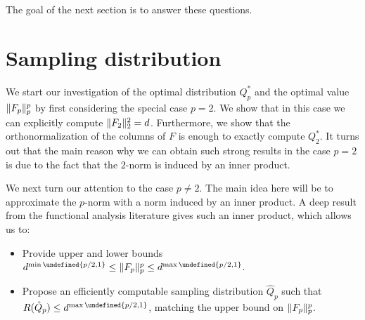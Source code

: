 \documentclass{article}
\theoremstyle{plain}
\theoremstyle{definition}
\theoremstyle{remark}
\let\brace\undefined
\DeclarePairedDelimiter{\brace}{\lbrace}{\rbrace}
\DeclarePairedDelimiter{\norm}{\lVert}{\rVert}
\begin{document}
The goal of the next section is to answer these questions.

\section{Sampling distribution}
We start our investigation of the optimal distribution $Q_p^{*}$ and the optimal value $\norm{F_p}_p^p$ by first considering the special case $p=2$. We show that in this case we can explicitly compute $\norm{F_2}_{2}^{2} = d$. Furthermore, we show that the orthonormalization of the columns of $F$ is enough to exactly compute $Q_2^{*}$. It turns out that the main reason why we can obtain such strong results in the case $p=2$ is due to the fact that the $2$-norm is induced by an inner product.

We next turn our attention to the case $p \neq 2$. The main idea here will be to approximate the $p$-norm with a norm induced by an inner product. A deep result from the functional analysis literature gives such an inner product, which allows us to:
\begin{itemize}
    \item Provide upper and lower bounds $d^{\min{\brace{p/2, 1}}} \leq \norm{F_p}_p^p \leq d^{\max{\brace{p/2, 1}}}$.
    \item Propose an efficiently computable sampling distribution $\hat{Q}_p$ such that $R(\hat{Q}_p) \leq d^{\max{\brace{p/2, 1}}}$, matching the upper bound on $\norm{F_p}_p^p$.
\end{itemize}
\end{document}
